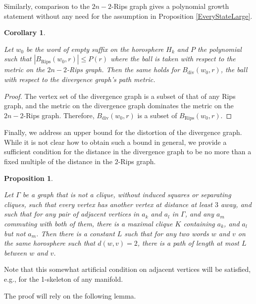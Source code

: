\documentclass[10pt,a4paper]{amsart}
\newtheorem{corollary}[theorem]{Corollary}
\newtheorem{proposition}[theorem]{Proposition}
\theoremstyle{definition}
\theoremstyle{remark}
\begin{document}
	Similarly, comparison to the $2n-2$-Rips graph gives a polynomial growth statement without any need for the assumption in Proposition \ref{EveryStateLarge}.
	
	\begin{corollary}\label{DivergenceGrowth}
		
		Let $w_0$ be the word of empty suffix on the horosphere $H_k$ and $P$ the polynomial such that $|B_{\text{Rips}}(w_0, r)|\le P(r)$ where the ball is taken with respect to the metric on the $2n-2$-Rips graph. Then the same holds for $B_{\text{div}}(w_0, r)$, the ball with respect to the divergence graph's path metric.
		
	\end{corollary}
	
	\begin{proof}
		
		The vertex set of the divergence graph is a subset of that of any Rips graph, and the metric on the divergence graph dominates the metric on the $2n-2$-Rips graph. Therefore, $B_{\text{div}}(w_0, r)$ is a subset of $B_{\text{Rips}}(w_0, r)$.
	\end{proof}
	
	Finally, we address an upper bound for the distortion of the divergence graph. While it is not clear how to obtain such a bound in general, we provide a sufficient condition for the distance in the divergence graph to be no more than a fixed multiple of the distance in the $2$-Rips graph.
	
	\begin{proposition}\label{DivergenceDistortionUpperBound}
		
		Let $\Gamma$ be a graph that is not a clique, without induced squares or separating cliques, such that every vertex has another vertex at distance at least $3$ away, and such that for any pair of adjacent vertices in $a_{k}$ and $a_l$ in $\Gamma$, and any $a_m$ commuting with both of them, there is a maximal clique $K$ containing $a_k$, and $a_l$ but not $a_m$. Then there is a constant $L$ such that for any two words $w$ and $v$ on the same horosphere such that $d(w,v)=2$, there is a path of length at most $L$ between $w$ and $v$. 
		
	\end{proposition}
	
	
	Note that this somewhat artificial condition on adjacent vertices will be satisfied, e.g., for the 1-skeleton of any manifold. 
	
	The proof will rely on the following lemma.
	
\end{document}
